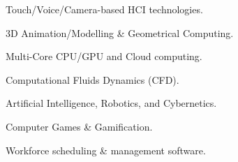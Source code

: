 

\begin{cventries}


  \cventry
    {} 
    {}
    {}
    {}
    {    	
	  \vspace{-1.7cm}
      \begin{multicols}{2}
      \begin{cvitems}
        \item {Touch/Voice/Camera-based HCI technologies.}
        \item {3D Animation/Modelling \& Geometrical Computing.}
        \item {Multi-Core CPU/GPU and Cloud computing.}
        \item {Computational Fluids Dynamics (CFD).}
        \item {Artificial Intelligence, Robotics, and Cybernetics.}
        \item {Computer Games \& Gamification.}
        \item {Workforce scheduling \& management software.}
      \end{cvitems}
	  \end{multicols}
	  \vspace{-0.5cm}
    }

\end{cventries}

